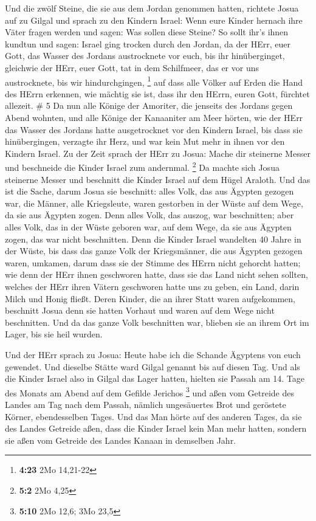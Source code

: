 Und die zwölf Steine, die sie aus dem Jordan genommen
hatten, richtete Josua auf zu Gilgal  und sprach zu den
Kindern Israel: Wenn eure Kinder hernach ihre Väter fragen werden und
sagen: Was sollen diese Steine?  So sollt ihr's ihnen
kundtun und sagen: Israel ging trocken durch den Jordan, 
da der HErr, euer Gott, das Wasser des Jordans austrocknete vor euch,
bis ihr hinüberginget, gleichwie der HErr, euer Gott, tat in dem
Schilfmeer, das er vor uns austrocknete, bis wir hindurchgingen,
\footnote{\textbf{4:23} 2Mo 14,21-22}  auf dass alle Völker
auf Erden die Hand des HErrn erkennen, wie mächtig sie ist, dass ihr den
HErrn, euren Gott, fürchtet allezeit. \# 5  Da nun alle
Könige der Amoriter, die jenseits des Jordans gegen Abend wohnten, und
alle Könige der Kanaaniter am Meer hörten, wie der HErr das Wasser des
Jordans hatte ausgetrocknet vor den Kindern Israel, bis dass sie
hinübergingen, verzagte ihr Herz, und war kein Mut mehr in ihnen vor den
Kindern Israel.  Zu der Zeit sprach der HErr zu Josua: Mache
dir steinerne Messer und beschneide die Kinder Israel zum andernmal.
\footnote{\textbf{5:2} 2Mo 4,25}  Da machte sich Josua
steinerne Messer und beschnitt die Kinder Israel auf dem Hügel Araloth.
 Und das ist die Sache, darum Josua sie beschnitt: alles
Volk, das aus Ägypten gezogen war, die Männer, alle Kriegsleute, waren
gestorben in der Wüste auf dem Wege, da sie aus Ägypten zogen.
 Denn alles Volk, das auszog, war beschnitten; aber alles
Volk, das in der Wüste geboren war, auf dem Wege, da sie aus Ägypten
zogen, das war nicht beschnitten.  Denn die Kinder Israel
wandelten 40 Jahre in der Wüste, bis dass das ganze Volk der
Kriegsmänner, die aus Ägypten gezogen waren, umkamen, darum dass sie der
Stimme des HErrn nicht gehorcht hatten; wie denn der HErr ihnen
geschworen hatte, dass sie das Land nicht sehen sollten, welches der
HErr ihren Vätern geschworen hatte uns zu geben, ein Land, darin Milch
und Honig fließt.  Deren Kinder, die an ihrer Statt waren
aufgekommen, beschnitt Josua denn sie hatten Vorhaut und waren auf dem
Wege nicht beschnitten.  Und da das ganze Volk beschnitten
war, blieben sie an ihrem Ort im Lager, bis sie heil wurden.

 Und der HErr sprach zu Josua: Heute habe ich die Schande
Ägyptens von euch gewendet. Und dieselbe Stätte ward Gilgal genannt bis
auf diesen Tag.  Und als die Kinder Israel also in Gilgal
das Lager hatten, hielten sie Passah am 14. Tage des Monats am Abend auf
dem Gefilde Jerichos \footnote{\textbf{5:10} 2Mo 12,6; 3Mo 23,5}
 und aßen vom Getreide des Landes am Tag nach dem Passah,
nämlich ungesäuertes Brot und geröstete Körner, ebendesselben Tages.
 Und das Man hörte auf des anderen Tages, da sie des Landes
Getreide aßen, dass die Kinder Israel kein Man mehr hatten, sondern sie
aßen vom Getreide des Landes Kanaan in demselben Jahr.


